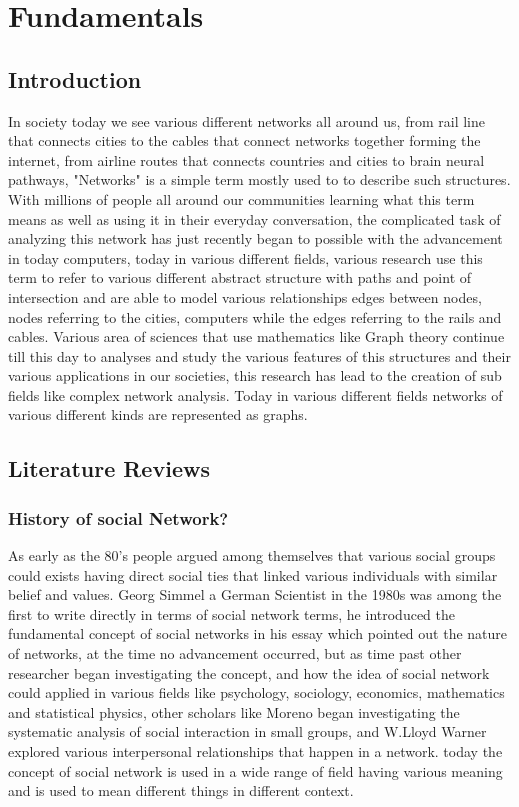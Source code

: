 \chapter{Fundamentals}






\section{Introduction}
In society today we see various different networks all around us, from rail line that connects cities to the cables that connect networks together forming the internet, from airline routes that connects countries and cities to brain neural pathways, "Networks" is a simple term mostly used to to describe such structures. With millions of people all around our communities learning what this term means as well as using it in their everyday conversation, the complicated task of analyzing this network has just recently began to possible with the advancement in today computers, today in various different fields, various research use this term to refer to various different abstract structure with paths and point of intersection and are able to model various relationships edges between nodes, nodes referring to the cities, computers while the edges referring to the rails and cables. Various area of sciences that use mathematics like Graph theory continue till this day to analyses and study the various features of this structures and their various applications in our societies, this research has lead to the creation of sub fields like complex network analysis. Today in various different fields networks of various different kinds are represented as graphs.   


\section{Literature Reviews}
\subsection{History of social Network?}
As early as the 80's people argued among themselves that various social groups could exists having direct social ties that linked various individuals with similar belief and values. Georg Simmel a German Scientist in the 1980s was among the first to write directly in terms of social network terms, he introduced the fundamental concept of social networks in his essay which pointed out the nature of networks, at the time no advancement occurred, but as time past other researcher began investigating the concept, and how the idea of social network could applied in various fields like psychology, sociology, economics, mathematics and statistical physics\cite{scottSocial},
other scholars like Moreno began investigating the systematic analysis of social interaction in small groups, and W.Lloyd Warner explored various interpersonal relationships that happen in a network.  today the concept of social network is used in a wide range of field having various meaning and is used to mean different things in different context. 

